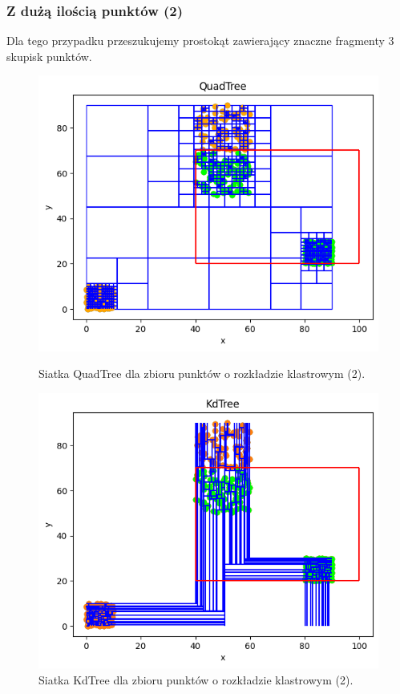 \documentclass{lab}
\begin{document}
\subsubsection{Z dużą ilością punktów (2)}
Dla tego przypadku przeszukujemy prostokąt zawierający znaczne fragmenty 3 skupisk punktów.

\begin{figure}[H]
  \centering
  \begin{minipage}{0.495\textwidth}
      \centering
      \includegraphics[width=1\textwidth]{resources/cluster_QuadTree_2.png}
      \caption{Siatka QuadTree dla zbioru punktów o rozkładzie klastrowym (2).}
      \label{fig:cluster_QuadTree_2}
  \end{minipage}
  \begin{minipage}{0.495\textwidth}
      \centering
      \includegraphics[width=1\textwidth]{resources/cluster_KdTree_2.png}
      \caption{Siatka KdTree dla zbioru punktów o rozkładzie klastrowym (2).}
      \label{fig:cluster_KdTree_2}
  \end{minipage}
\end{figure}
\end{document}
